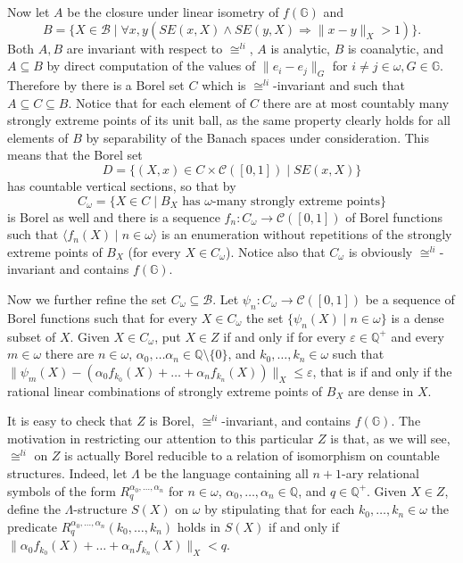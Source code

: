 \documentclass{amsart}
\theoremstyle{definition}
\theoremstyle{remark}
\begin{document}
Now let $A$ be the closure under linear isometry of $f({\mathbb{G}})$ and
\[ B =
\{ X \in \mathcal{B} \mid \forall x,y ({SE(x,X) \wedge SE(y,X)} {\Rightarrow}
\|x-y\|_X > 1) \} . \]
Both $A,B$ are invariant with respect to $\cong^{li}$, $A$ is
analytic, $B$ is coanalytic,  and $A \subseteq B$ by direct computation of the values of $\|e_i - e_j
\|_G$ for $i \neq j \in \omega,G \in {\mathbb{G}}$. Therefore by
\cite[Exercise 14.14]{Kechris1995} there is a Borel set $C$ which is
$\cong^{li}$-invariant and such that $A \subseteq C \subseteq B$.
Notice that for each element of $C$ there are at most countably many strongly
extreme points of  its unit ball, as the same property clearly holds for all
elements of $B$ by separability of the Banach spaces under
consideration. This means that
the Borel set
\[ D = \{ (X,x) \in C \times \mathcal{C}([0,1]) \mid SE(x,X) \} \]
has countable vertical sections, so that by \cite[Exercise 18.15]{Kechris1995}
\[ C_\omega = \{ X \in C \mid
B_X\text{ has }\omega\text{-many strongly extreme points} \} \]
 is Borel as well and  there is a sequence $f_n \colon C_\omega \to
\mathcal{C}([0,1])$ of Borel functions such that $\langle f_n(X) \mid n \in
  \omega \rangle$ is an enumeration without repetitions of the strongly
extreme points of $B_X$ (for every $X \in C_\omega$).
Notice also that $C_\omega$ is obviously $\cong^{li}$-invariant and
contains $f({\mathbb{G}})$.

Now we further refine the set $C_\omega \subseteq \mathcal{B}$. Let
$\psi_n \colon C_\omega \to
\mathcal{C}([0,1])$ be a sequence of Borel functions such that for
every $X \in C_\omega$ the set $\{ \psi_n(X) \mid n \in \omega \}$ is
a dense subset of $X$. Given $X \in C_\omega$, put $X \in Z$ if and only if
for every $\varepsilon \in {\mathbb{Q}}^+$ and every $m \in \omega$ there
  are $n \in \omega$, $\alpha_0 , \dotsc \alpha_n \in {\mathbb{Q}} \setminus \{
  0 \}$, and $k_0, \dotsc, k_n \in \omega$ such that  $\|
  \psi_m(X) - (\alpha_0 f_{k_0}(X) + \dotsc + \alpha_n f_{k_n}(X)) \|_X
  \leq \varepsilon$, that is  if and only if the rational linear
  combinations of strongly extreme points of $B_X$ are dense in
$X$.

It is easy to check that $Z$  is Borel, $\cong^{li}$-invariant, and
contains $f({\mathbb{G}})$. The motivation in restricting our attention
to this particular $Z$ is that, as we will see, $\cong^{li}$ on $Z$ is
actually Borel
reducible to a relation of isomorphism on countable structures. Indeed, let $\Lambda$
be the language containing all $n+1$-ary relational symbols of the
form  $R^{\alpha_0,
  \dotsc, \alpha_n}_q$ for $n \in \omega$, $\alpha_0, \dotsc, \alpha_n
\in {\mathbb{Q}}$, and $q \in {\mathbb{Q}}^+$. Given $X \in Z$, define the
$\Lambda$-structure $S(X)$ on $\omega$ by stipulating that for each
$k_0, \dotsc, k_n \in \omega$  the predicate $R^{ \alpha_0, \dotsc,
  \alpha_n}_q(k_0, \dotsc, k_n)$ holds in $S(X)$ if and only if $\|
\alpha_0 f_{k_0}(X) + \dotsc + \alpha_n f_{k_n}(X) \|_X < q$.
\end{document}
